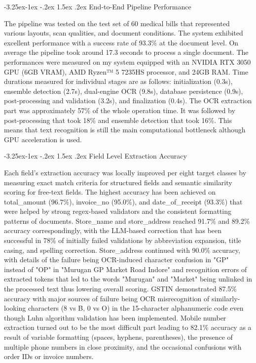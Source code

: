 \documentclass[conference,twocolumn]{IEEEtran}
\makeatletter
\renewcommand{\subsection}{\@startsection{subsection}{2}{\z@}%
  {-3.25ex\@plus -1ex \@minus -.2ex}%
  {1.5ex \@plus .2ex}%
  {\normalfont\normalsize\bfseries\itshape}}
\makeatother
\begin{document}
\subsection{End-to-End Pipeline Performance}

The pipeline was tested on the test set of 60 medical bills that represented
various layouts, scan qualities, and document conditions. The system
exhibited excellent performance with a success rate of 93.3\% at the
document level. On average the pipeline took around 17.3 seconds to
process a single document. The performances were measured on my system
equipped with an NVIDIA RTX 3050 GPU (6GB VRAM), AMD Ryzen™ 5 7235HS
processor, and 24GB RAM. Time durations measured for individual stages
are as follows: initialization (0.3s), ensemble detection (2.7s),
dual-engine OCR (9.8s), database persistence (0.9s), post-processing and
validation (3.2s), and finalization (0.4s). The OCR extraction part was
approximately 57\% of the whole operation time. It was followed by
post-processing that took 18\% and ensemble detection that took 16\%.
This means that text recognition is still the main computational
bottleneck although GPU acceleration is
used.

\subsection{Field Level Extraction Accuracy}

Each field's extraction accuracy was locally improved per
eight target classes by measuring exact match criteria for structured
fields and semantic similarity scoring for free-text fields. The highest
accuracy has been achieved on total\_amount (96.7\%), invoice\_no
(95.0\%), and date\_of\_receipt (93.3\%) that were helped by strong
regex-based validators and the consistent formatting patterns of
documents. Store\_name and store\_address reached 91.7\% and 89.2\%
accuracy correspondingly, with the LLM-based correction that has been
successful in 78\% of initially failed validations by abbreviation
expansion, title casing, and spelling correction. Store\_address
continued with 90.0\% accuracy, with details of the failure being
OCR-induced character confusion in "GP" instead of "OP" in "Murugan GP
Market Road Indore" and recognition errors of extracted tokens that led
to the words "Murugan" and "Market" being unlinked in the processed text
thus lowering overall scoring. GSTIN demonstrated 87.5\% accuracy with
major sources of failure being OCR misrecognition of similarly-looking
characters (8 vs B, 0 vs O) in the 15-character alphanumeric code even
though Luhn algorithm validation has been implemented. Mobile number
extraction turned out to be the most difficult part leading to 82.1\%
accuracy as a result of variable formatting (spaces, hyphens,
parentheses), the presence of multiple phone numbers in close proximity,
and the occasional confusions with order IDs or invoice
numbers.
\end{document}
